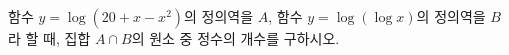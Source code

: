 함수 $y=\log (20+x-x^{2})$의 정의역을 $A$, 함수 $y=\log (\log x)$의 정의역을 $B$라 할 때, 집합 $A \cap B$의 원소 중 정수의 개수를 구하시오.
